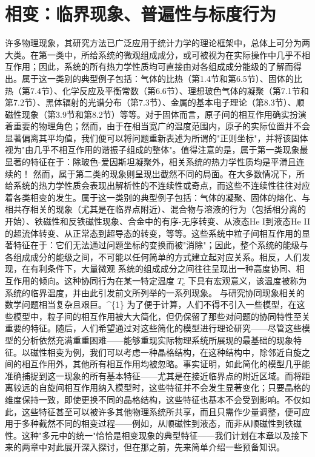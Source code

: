 ﻿\chapter{相变：临界现象、普遍性与标度行为}\label{ux76f8ux53d8ux4e34ux754cux73b0ux8c61ux666eux904dux6027ux4e0eux6807ux5ea6ux884cux4e3a}
许多物理现象，其研究方法已广泛应用于统计力学的理论框架中，总体上可分为两大类。在第一类中，所给系统的微观组成成分，或可被视为在实际操作中几乎不相互作用；因此，系统的所有热力学性质均可直接由对各组成成分能级的了解而得出。属于这一类别的典型例子包括：气体的比热（第1.4节和第6.5节）、固体的比热（第7.4节）、化学反应及平衡常数（第6.6节）、理想玻色气体的凝聚（第7.1节和第7.2节）、黑体辐射的光谱分布（第7.3节）、金属的基本电子理论（第8.3节）、顺磁性现象（第3.9节和第8.2节）等等。对于固体而言，原子间的相互作用确实扮演着重要的物理角色；然而，由于在相当宽广的温度范围内，原子的实际位置并不会显著偏离其平均值，我们便可以将问题重新表述为所谓的"正则坐标"，并将该固体视为"由几乎不相互作用的谐振子组成的整体"。值得注意的是，属于第一类现象最显著的特征在于：除玻色-爱因斯坦凝聚外，相关系统的热力学性质均是平滑且连续的！
然而，属于第二类的现象则呈现出截然不同的局面。在大多数情况下，所给系统的热力学性质会表现出解析性的不连续性或奇点，而这些不连续性往往对应着各类相变的发生。属于这一类别的典型例子包括：气体的凝聚、固体的熔化、与相共存相关的现象（尤其是在临界点附近）、混合物与溶液的行为（包括相分离的开始）、铁磁性和反铁磁性现象、合金中的有序-无序转变、从液态He I到液态He II的超流体转变、从正常态到超导态的转变，等等。这些系统中粒子间相互作用的显著特征在于：它们无法通过问题坐标的变换而被"消除"；因此，整个系统的能级与各组成成分的能级之间，不可能以任何简单的方式建立起对应关系。相反，人们发现，在有利条件下，大量微观
系统的组成成分之间往往呈现出一种高度协同、相互作用的倾向。这种协同行为在某一特定温度 \(T_{c}\) 下具有宏观意义，该温度被称为系统的临界温度，并由此引发前文所列举的一系列现象。
与研究协同现象相关的数学问题相当复杂且艰巨。\^{}\{1\} 为了便于计算，人们不得不引入一些模型，在这些模型中，粒子间的相互作用被大大简化，但仍保留了那些对问题的协同特性至关重要的特征。随后，人们希望通过对这些简化的模型进行理论研究——尽管这些模型的分析依然充满重重困难——能够重现实际物理系统所展现的最基础的现象特征。以磁性相变为例，我们可以考虑一种晶格结构，在这种结构中，除邻近自旋之间的相互作用外，其他所有相互作用均被忽略。事实证明，如此简化的模型几乎能准确捕捉到这一现象的所有基本特征——尤其是在接近临界点的附近区域。而将距离较远的自旋间相互作用纳入模型时，这些特征并不会发生显著变化；只要晶格的维度保持一致，即使更换不同的晶格结构，这些特征也基本不会受到影响。不仅如此，这些特征甚至可以被许多其他物理系统所共享，而且只需作少量调整，便可应用于多种截然不同的相变过程——例如，从顺磁性到液态，而非从顺磁性到铁磁性。这种"多元中的统一"恰恰是相变现象的典型特征——我们计划在本章以及接下来的两章中对此展开深入探讨，但在那之前，先来简单介绍一些预备知识。
